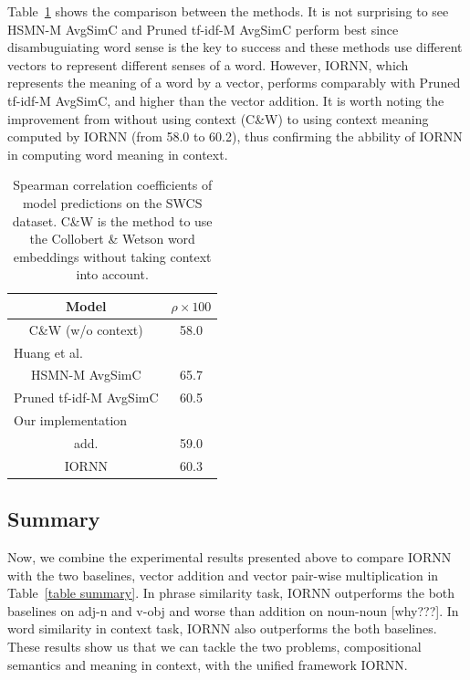 \documentclass[11pt]{article}
\begin{document}
Table~\ref{table swsc result} shows the comparison between the methods.
It is not surprising to see HSMN-M AvgSimC and Pruned tf-idf-M AvgSimC perform best since disambuguiating
word sense is the key to success and these methods use different vectors to represent different senses of a word.
However, IORNN, which represents the meaning of a word by a vector, performs comparably 
with Pruned tf-idf-M AvgSimC, and higher than the vector addition. It is worth noting the improvement from 
without using context (C\&W) to using context meaning computed by IORNN (from 58.0 to 60.2), thus 
confirming the abbility of IORNN in computing word meaning in context.

\begin{table}[!ht]
	\center
	\begin{tabular}{cc}
		\hline
		Model & $\rho \times 100$ \\ \hline \hline

		C\&W (w/o context) & 58.0 \\ \hline
		
		\multicolumn{2}{l}{Huang et al.} \\
		HSMN-M AvgSimC & 65.7 \\ 
		Pruned tf-idf-M AvgSimC & 60.5 \\ \hline 
		
		\multicolumn{2}{l}{Our implementation} \\
		add. & 59.0 \\
		IORNN & 60.3 \\ \hline
		
	\end{tabular}
	\caption{Spearman correlation coefficients of model predictions on the SWCS dataset.
	C\&W is the method to use the Collobert \& Wetson word embeddings without taking context into account. }
	\label{table swsc result}
\end{table}


 

\subsection{Summary} 

Now, we combine the experimental results presented above to compare IORNN 
with the two baselines, vector addition and vector pair-wise multiplication in 
Table~\ref{table summary}. In phrase similarity task, IORNN outperforms the both baselines
on adj-n and v-obj and worse than addition on noun-noun [why???]. In word similarity in context 
task, IORNN also outperforms the both baselines. These results show us that we can 
tackle the two problems, compositional semantics and meaning in context, with the unified framework 
IORNN.
\end{document}
